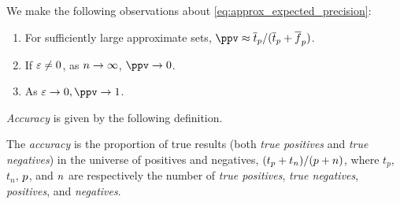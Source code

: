 We make the following observations about \cref{eq:approx_expected_precision}:
\begin{enumerate}
	\item For sufficiently large approximate sets, $\ppv \approx \overline{t}_\p / (\overline{t}_\p + \overline{f}_\p)$.
	\item If $\varepsilon \neq 0$, as $n \to \infty$, $\ppv \to 0$.
	\item As $\fprate \to 0, \ppv \to 1$.
\end{enumerate}

\emph{Accuracy} is given by the following definition.
\begin{definition}
	The \emph{accuracy} is the proportion of true results (both \emph{true
		positives} and \emph{true negatives}) in the universe of positives and
	negatives, $(t_p + t_n)/(p + n)$, where $t_p$, $t_n$, $p$, and $n$ are
	respectively the number of \emph{true positives}, \emph{true negatives},
	\emph{positives}, and \emph{negatives}.
\end{definition}

